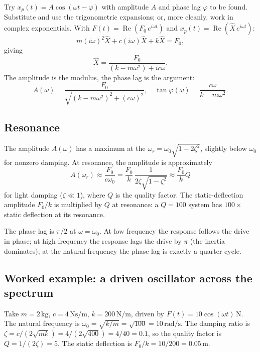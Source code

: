 Try $x_{p}(t) = A \cos(\omega t - \varphi)$ with amplitude $A$ and
phase lag $\varphi$ to be found. Substitute and use the
trigonometric expansions; or, more cleanly, work in complex
exponentials. With $F(t) = \operatorname{Re}(F_{0}\, e^{i \omega
t})$ and $x_{p}(t) = \operatorname{Re}(\hat{X}\, e^{i \omega t})$:
\[
m (i\omega)^{2} \hat{X} + c (i\omega) \hat{X} + k \hat{X} = F_{0},
\]
giving
\[
\hat{X} = \frac{F_{0}}{(k - m \omega^{2}) + i c \omega}.
\]
The amplitude is the modulus, the phase lag is the argument:
\[
A(\omega) = \frac{F_{0}}{\sqrt{(k - m\omega^{2})^{2} + (c\omega)^{2}}},
\quad
\tan\varphi(\omega) = \frac{c\omega}{k - m\omega^{2}}.
\]

\subsection{Resonance}

The amplitude $A(\omega)$ has a maximum at the  $\omega_{r} = \omega_{0}\sqrt{1 - 2\zeta^{2}}$, slightly
below $\omega_{0}$ for nonzero damping. At resonance, the amplitude
is approximately
\[
A(\omega_{r}) \approx \frac{F_{0}}{c \omega_{0}} = \frac{F_{0}}{k}\, \frac{1}{2\zeta\sqrt{1-\zeta^{2}}} \approx \frac{F_{0}}{k} Q
\]
for light damping ($\zeta \ll 1$), where $Q$ is the quality factor.
The static-deflection amplitude $F_{0}/k$ is multiplied by $Q$ at
resonance: a $Q = 100$ system has $100\times$ static deflection at
its resonance.

The phase lag is $\pi/2$ at $\omega = \omega_{0}$. At low frequency
the response follows the drive in phase; at high frequency the
response lags the drive by $\pi$ (the inertia dominates); at the
natural frequency the phase lag is exactly a quarter cycle.



\subsection{Worked example: a driven oscillator across the spectrum}

Take $m = 2\,\si{\kilogram}$, $c = 4\,\si{\newton\second\per\meter}$,
$k = 200\,\si{\newton\per\meter}$, driven by $F(t) = 10\cos(\omega t)
\,\si{\newton}$. The natural frequency is $\omega_{0} = \sqrt{k/m} =
\sqrt{100} = 10\,\si{\radian\per\second}$. The damping ratio is
$\zeta = c/(2\sqrt{mk}) = 4/(2\sqrt{400}) = 4/40 = 0.1$, so the
quality factor is $Q = 1/(2\zeta) = 5$. The static deflection is
$F_{0}/k = 10/200 = 0.05\,\si{\meter}$.

